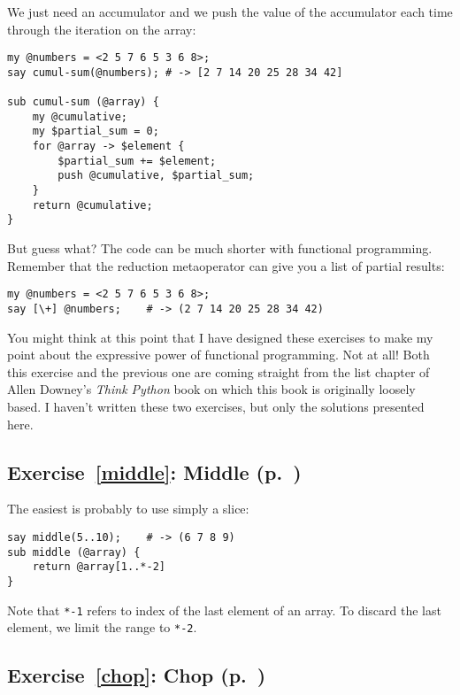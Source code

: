 {We just need an accumulator and we push the value of 
the accumulator each time through the iteration 
on the array:

\begin{verbatim}
my @numbers = <2 5 7 6 5 3 6 8>;
say cumul-sum(@numbers); # -> [2 7 14 20 25 28 34 42]

sub cumul-sum (@array) {
    my @cumulative;
    my $partial_sum = 0;
    for @array -> $element {
        $partial_sum += $element;
        push @cumulative, $partial_sum;
    }
    return @cumulative;
}
\end{verbatim}

But guess what? The code can be much shorter with 
functional programming. Remember that the reduction 
metaoperator can give you a list of partial results:

\begin{verbatim}
my @numbers = <2 5 7 6 5 3 6 8>;
say [\+] @numbers;    # -> (2 7 14 20 25 28 34 42)
\end{verbatim}

You might think at this point that I have designed these 
exercises to make my point about the expressive power 
of functional programming. Not at all! Both this 
exercise and the previous one are coming straight from 
the list chapter of Allen Downey's \emph{Think Python} 
book on which this book is originally loosely based. 
I haven't written these two exercises, but only the 
solutions presented here.


\subsection{Exercise~\ref{middle}: Middle (p.~\pageref{middle})}
\label{sol_middle}

The easiest is probably to use simply a slice:

\begin{verbatim}
say middle(5..10);    # -> (6 7 8 9)
sub middle (@array) { 
    return @array[1..*-2] 
}
\end{verbatim}

Note that \verb'*-1' refers to index of the last element 
of an array. To discard the last element, we limit the 
range to \verb'*-2'.

\subsection{Exercise~\ref{chop}: Chop (p.~\pageref{chop})}
\label{sol_chop}

}
